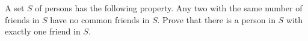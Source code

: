 A set $S$ of persons has the following property. Any two with the same number of friends in $S$ have no common friends in $S$. Prove that there is a person in $S$ with exactly one friend in $S$.
